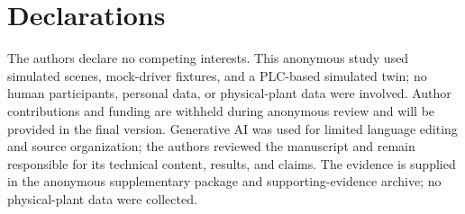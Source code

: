 \documentclass[journal]{IEEEtran}
\begin{document}








\section*{Declarations}
The authors declare no competing interests. This anonymous study used simulated scenes, mock-driver fixtures, and a PLC-based simulated twin; no human participants, personal data, or physical-plant data were involved. Author contributions and funding are withheld during anonymous review and will be provided in the final version. Generative AI was used for limited language editing and source organization; the authors reviewed the manuscript and remain responsible for its technical content, results, and claims. The evidence is supplied in the anonymous supplementary package and supporting-evidence archive; no physical-plant data were collected.



\end{document}
